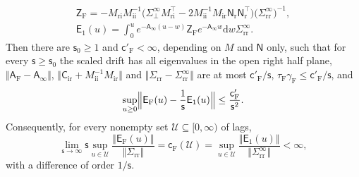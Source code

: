 \begin{proposition}
\begin{enumerate}
\begin{equation}
\begin{gathered}
\mathsf Z_{\mathrm F}=-M_{\mathrm{ri}}M_{\mathrm{ii}}^{-1}\bigl(\Sigma^\infty_\perp M_{\mathrm{ri}}^\top-2M_{\mathrm{ii}}^{-1}M_{\mathrm{ir}}\mathsf N_{\mathrm r}\mathsf N_{\mathrm r}^\top\bigr)\bigl(\Sigma^\infty_{\mathrm{rr}}\bigr)^{-1},\\
\mathsf E_1(u)=\int_0^ue^{-\mathsf A_\infty(u-w)}\mathsf Z_{\mathrm F}e^{-\mathsf A_\infty w}\mathrm dw\Sigma^\infty_{\mathrm{rr}}.
\end{gathered}
\end{equation}
Then there are $\mathsf s_0\ge1$ and $\mathsf c'_{\mathrm F}<\infty$, depending on $M$ and $\mathsf N$ only, such that for every $\mathsf s\ge\mathsf s_0$ the scaled drift has all eigenvalues in the open right half plane, $\Vert\mathsf A_{\mathrm F}-\mathsf A_\infty\Vert$, $\Vert\mathsf C_{\mathrm{ir}}+M_{\mathrm{ii}}^{-1}M_{\mathrm{ir}}\Vert$ and $\Vert\Sigma_{\mathrm{rr}}-\Sigma^\infty_{\mathrm{rr}}\Vert$ are at most $\mathsf c'_{\mathrm F}/\mathsf s$, $\tau_{\mathrm F}\gamma_{\mathrm F}\le\mathsf c'_{\mathrm F}/\mathsf s$, and
\begin{equation}\label{eq:ren-adiabatic-rate}
\sup_{u\ge0}\Bigl\Vert\mathsf E_{\mathrm F}(u)-\frac1{\mathsf s}\mathsf E_1(u)\Bigr\Vert\le\frac{\mathsf c'_{\mathrm F}}{\mathsf s^2}.
\end{equation}
Consequently, for every nonempty set $\mathcal U\subseteq[0,\infty)$ of lags,
\begin{equation}\label{eq:ren-adiabatic-coefficient}
\lim_{\mathsf s\to\infty}\mathsf s\sup_{u\in\mathcal U}\frac{\Vert\mathsf E_{\mathrm F}(u)\Vert}{\Vert\Sigma_{\mathrm{rr}}\Vert}=\mathsf c_{\mathrm F}(\mathcal U)=\sup_{u\in\mathcal U}\frac{\Vert\mathsf E_1(u)\Vert}{\Vert\Sigma^\infty_{\mathrm{rr}}\Vert}<\infty,
\end{equation}
with a difference of order $1/\mathsf s$.

\end{enumerate}
\end{proposition}
